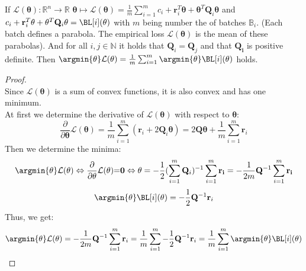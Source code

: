 \begin{proposition}
	If $ \mathcal{L}(\mathbf{\theta}) : \mathbb{R}^n \rightarrow \mathbb{R}$ $\mathbf{\theta} \mapsto  \mathcal{L}(\mathbf{\theta})=\frac{1}{m}\sum_{i=1}^m c_i+\mathbf{r}_i^T\mathbf{\theta}+\mathbf{\theta}^T\mathbf{Q}_i\mathbf{\theta}$ and $ c_i+\mathbf{r}_i^T\mathbf{\theta}+\mathbf{\theta}^T\mathbf{Q}_i\mathbf{\theta}= \BL[i](\mathbf{\theta})$ with $m$ being number the of batches $\mathbb{B}_i$. (Each batch defines a parabola. The empirical loss $\mathcal{L}(\mathbf{\theta})$ is the mean of these parabolas). And for all  $i,j \in \mathbb{N}$ it holds that $ \mathbf{Q}_i=\mathbf{Q}_j$ and that $\mathbf{Q_i}$ is positive definite. Then $\argmin{\theta} \mathcal{L}(\mathbf{\theta}) =\frac{1}{m}\sum_{i=1}^m\argmin{\theta} \BL[i](\mathbf{\theta})$ holds.
\end{proposition}

\begin{proof}
 \quad\\ 
 Since $\mathcal{L}(\mathbf{\theta})$ is a sum of convex functions, it is also convex and has one minimum.\\
 At first we determine the derivative of $\mathcal{L}(\mathbf{\theta})$ with respect to $\mathbf{\theta}$:
  \begin{equation}
 \frac{\partial}{\partial \mathbf{\theta}}\mathcal{L}(\mathbf{\theta})= \frac{1}{m}\sum\limits_{i=1}^m(\mathbf{r}_i+2\mathbf{Q}_i\mathbf{\theta})= 2\mathbf{Q}\mathbf{\theta}+\frac{1}{m}\sum\limits_{i=1}^m\mathbf{r}_i
 \end{equation}
Then we determine the minima:
   \begin{equation}
  \argmin{\mathbf{\theta}} \mathcal{L}(\mathbf{\theta}) \Leftrightarrow
 \frac{\partial}{\partial \mathbf{\theta}}\mathcal{L}(\mathbf{\theta}){=}\mathbf{0} \Leftrightarrow \mathbf{\theta}=-\frac{1}{2}( \sum\limits_{i=1}^m \mathbf{Q}_i)^{-1} \sum\limits_{i=1}^m \mathbf{r_i}= -\frac{1}{2m} \mathbf{Q}^{-1} \sum\limits_{i=1}^m \mathbf{r_i}
   \end{equation}
   \begin{equation}
\argmin{\mathbf{\theta}} \BL[i](\mathbf{\theta})=-\frac{1}{2}\mathbf{Q}^{-1}\mathbf{r}_i
 \end{equation}
 Thus, we get:
 \begin{equation}
  \argmin{\mathbf{\theta}} \mathcal{L}(\mathbf{\theta})= -\frac{1}{2m}\mathbf{Q}^{-1}\sum\limits_{i=1}^m \mathbf{r}_i=\frac{1}{m}\sum\limits_{i=1}^m -\frac{1}{2}\mathbf{Q}^{-1}\mathbf{r}_i =\frac{1}{m}\sum\limits_{i=1}^m\argmin{\mathbf{\theta}} \BL[i](\mathbf{\theta})
  \end{equation}
\end{proof}